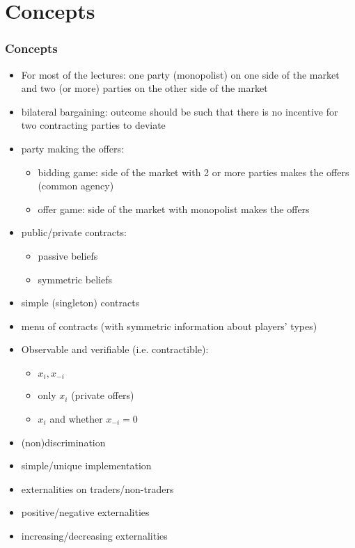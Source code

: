 \documentclass[11pt,english]{beamer}
\begin{document}
\section{Concepts}
\begin{frame}[allowframebreaks]\frametitle{Concepts}
  \begin{itemize}
  \item For most of the lectures: one party (monopolist) on one side
    of the market and two (or more) parties on the other side of the
    market
  \item bilateral bargaining: outcome should be such that there is no
    incentive for two contracting parties to deviate
  \item party making the offers:
    \begin{itemize}
    \item bidding game: side of the market with 2 or more parties
      makes the offers (common agency)
    \item offer game: side of the market with monopolist makes the
      offers
    \end{itemize} %
  \item public/private contracts:
    \begin{itemize}
    \item passive beliefs
    \item symmetric beliefs
    \end{itemize} %
  \item simple (singleton) contracts
  \item menu of contracts (with symmetric information about players' types)
  \item Observable and verifiable (i.e. contractible):
    \begin{itemize}
    \item $x_i,x_{-i}$
    \item only $x_i$ (private offers)
    \item $x_i$ and whether $x_{-i} =0$
    \end{itemize} %
  \item (non)discrimination
  \item simple/unique implementation
  \item externalities on traders/non-traders
  \item positive/negative externalities
  \item increasing/decreasing externalities
  \end{itemize} %
\end{frame}
\end{document}
